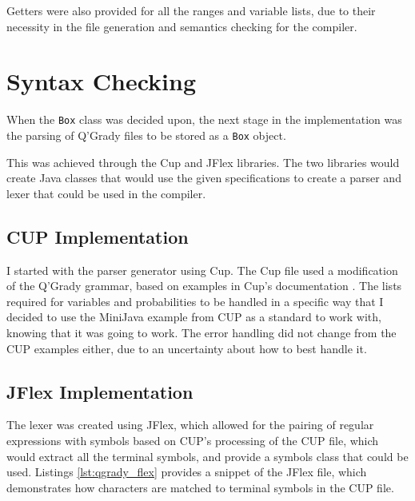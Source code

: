 \documentclass[report.tex]{subfiles}
\begin{document}
Getters were also provided for all the ranges and variable lists, due to their
necessity in the file generation and semantics checking for the compiler.

\section{Syntax Checking} %
\label{sec:syntax_checking}
When the \texttt{Box} class was decided upon, the next stage in the
implementation was the parsing of Q'Grady files to be stored as a \texttt{Box}
object.

This was achieved through the Cup and JFlex libraries. The two libraries would
create Java classes that would use the given specifications to create a parser
and lexer that could be used in the compiler.

\subsection{CUP Implementation} %
\label{sub:cup_impl}
I started with the parser generator using Cup. The Cup file used a modification
of the Q'Grady grammar, based on examples in Cup's documentation 
\cite{cup_example}. The lists required for variables and probabilities to be
handled in a specific way that I decided to use the MiniJava example from CUP
as a standard to work with, knowing that it was going to work. The error
handling did not change from the CUP examples either, due to an uncertainty
about how to best handle it.

\subsection{JFlex Implementation} %
\label{sub:jflex_impl}
The lexer was created using JFlex, which allowed for the pairing of regular
expressions with symbols based on CUP's processing of the CUP file, which would
extract all the terminal symbols, and provide a symbols class that could be
used. Listings \ref{lst:qgrady_flex} provides a snippet of the JFlex file, which
demonstrates how characters are matched to terminal symbols in the CUP file.

 

\end{document}
